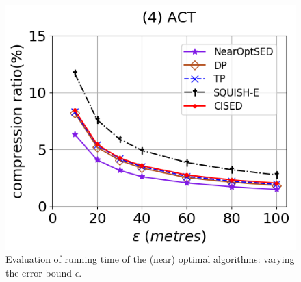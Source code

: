 {\begin{figure}[h]
	\includegraphics[scale=0.15]{Figures/Exp-SED-CR-epsilon-zh.png} 
	\vspace{-2.5ex}
	\caption{\small Evaluation of running time of the (near) optimal algorithms: varying the error bound $\epsilon$.}
	\label{fig:time-opt}
	\vspace{-3ex}
\end{figure}
}%